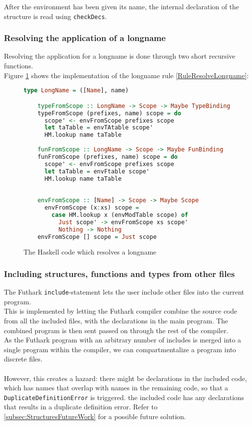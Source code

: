 After the environment has been given its name, the internal declaration of the
structure is read using \texttt{checkDecs}.
\\
\subsubsection{Resolving the application of a longname}
Resolving the application for a longname is done through two short recursive
functions.
\\
Figure \ref{ResolveLongname} shows the implementation of the longname rule
\ref{RuleResolveLongname}:
\begin{figure}
  \begin{lstlisting}[language=Haskell]
    type LongName = ([Name], name)

    typeFromScope :: LongName -> Scope -> Maybe TypeBinding
    typeFromScope (prefixes, name) scope = do
      scope' <- envFromScope prefixes scope
      let taTable = envTAtable scope'
      HM.lookup name taTable
    
    funFromScope :: LongName -> Scope -> Maybe FunBinding
    funFromScope (prefixes, name) scope = do
      scope' <- envFromScope prefixes scope
      let taTable = envFtable scope'
      HM.lookup name taTable
    
    
    envFromScope :: [Name] -> Scope -> Maybe Scope
      envFromScope (x:xs) scope =
        case HM.lookup x (envModTable scope) of
          Just scope' -> envFromScope xs scope'
          Nothing -> Nothing
    envFromScope [] scope = Just scope
\end{lstlisting}
\caption{The Haskell code which resolves a longname \label{ResolveLongname}}
\end{figure}

\subsubsection{Including structures, functions and types from other files\label{structuresincludes}}
The Futhark \texttt{include}-statement lets the user include
other files into the current program.
\\
This is implemented by letting the Futhark compiler combine the source code from
all the included files, with the declarations in the main program. The combined
program is then sent passed on through the rest of the compiler.
\\
As the Futhark program with an arbitrary number of includes is merged into a
single program within the compiler, we can compartmentalize a program into
discrete files.
\\
\\
However, this creates a hazard: there might be declarations in the included
code, which has names that overlap with names in the remaining code, so that a
\texttt{DuplicateDefinitionError} is triggered. the included code has any declarations
that results in a duplicate definition error. Refer to
\ref{subsec:StructuresFutureWork} for a possible future solution.

